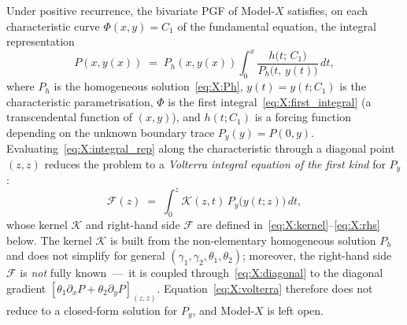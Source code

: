 \begin{claim}\label{clm:X:volterra}
    Under positive recurrence, the bivariate PGF of Model-$X$ satisfies, on each
    characteristic curve $\Phi(x,y)=C_1$ of the fundamental equation, the integral
    representation
    \begin{equation}
        P(x,y(x)) \;=\; P_h(x,y(x))\int_{0}^{x}
        \frac{h\bigl(t;\,C_1\bigr)}{P_h\bigl(t,\,y(t)\bigr)}\,dt,
        \label{eq:X:integral_rep}
    \end{equation}
    where $P_h$ is the homogeneous solution~\eqref{eq:X:Ph}, $y(t)=y(t;C_1)$ is the
    characteristic parametrisation, $\Phi$ is the first integral~\eqref{eq:X:first_integral}
    (a transcendental function of $(x,y)$), and
    $h(t;C_1)$ is a forcing function depending on the unknown boundary trace
    $P_y(y)=P(0,y)$. Evaluating~\eqref{eq:X:integral_rep} along the characteristic
    through a diagonal point $(z,z)$ reduces the problem to a \emph{Volterra integral
    equation of the first kind} for $P_y$:
    \begin{equation}
        \mathcal{F}(z) \;=\; \int_0^z \mathcal{K}(z,t)\,P_y\!\bigl(y(t;z)\bigr)\,dt,
        \label{eq:X:volterra}
    \end{equation}
    whose kernel $\mathcal{K}$ and right-hand side $\mathcal{F}$ are defined
    in~\eqref{eq:X:kernel}--\eqref{eq:X:rhs} below. The kernel $\mathcal{K}$ is built
    from the non-elementary homogeneous solution $P_h$ and does not simplify for general
    $(\gamma_1,\gamma_2,\theta_1,\theta_2)$; moreover, the
    right-hand side $\mathcal{F}$ is \emph{not} fully known~---~it is coupled
    through~\eqref{eq:X:diagonal} to the diagonal gradient
    $[\theta_1\partial_x P+\theta_2\partial_y P]_{(z,z)}$. Equation~\eqref{eq:X:volterra}
    therefore does not reduce to a closed-form solution for $P_y$, and Model-$X$ is left
    open.
\end{claim}

